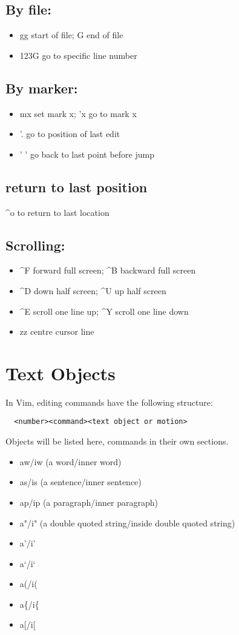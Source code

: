 \documentclass{article}
\begin{document}
    \subsection{By file:}
        \begin{itemize}
        \item gg start of file; G end of file
        \item 123G go to specific line number
        \end{itemize}
    \subsection{By marker:}
        \begin{itemize}
        \item mx set mark x; 'x go to mark x
        \item '. go to position of last edit
        \item ' ' go back to last point before jump
        \end{itemize}
    \subsection{return to last position}
        \textasciicircum o to return to last location

    \subsection{Scrolling:}
        \begin{itemize}
        \item \textasciicircum F forward full screen; \textasciicircum B backward full screen
        \item \textasciicircum D down half screen; \textasciicircum U up half screen
        \item \textasciicircum E scroll one line up; \textasciicircum Y scroll one line down
        \item zz centre cursor line
    \end{itemize}
\section{Text Objects}
In Vim, editing commands have the following structure:\\
\begin{verbatim}
  <number><command><text object or motion>
  \end{verbatim}
  Objects will be listed here, commands in their own sections.
\begin{itemize}
    \item aw/iw (a word/inner word)
    \item as/is (a sentence/inner sentence)
    \item ap/ip (a paragraph/inner paragraph)
    \item a"/i" (a double quoted string/inside double quoted string)
    \item a'/i'
    \item a`/i`
    \item a(/i(
    \item a\{/i\{
    \item a[/i[
\end{itemize}
\end{document}
